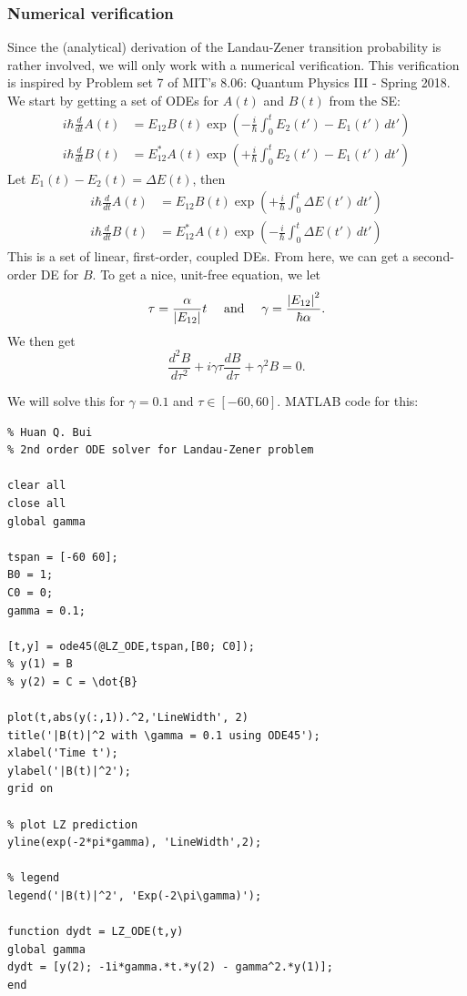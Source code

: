 \documentclass{book}
\theoremstyle{definition}
\newcommand{\al}{\alpha}
\newcommand{\f}[2]{\frac{#1}{#2}}
\newcommand{\lp}{\left(}
\newcommand{\rp}{\right)}
\begin{document}
\subsubsection*{Numerical verification}



Since the (analytical) derivation of the Landau-Zener transition probability is rather involved, we will only work with a numerical verification. This verification is inspired by Problem set 7 of MIT's 8.06: Quantum Physics III - Spring 2018. \\


We start by getting a set of ODEs for $A(t)$ and $B(t)$ from the SE:
\begin{align*}
i\hbar  \f{d}{dt}A(t) &= E_{12} B(t)  \exp\lp -\f{i}{\hbar} \int_0^t E_2(t') - E_1(t') \,dt'\rp\\
i\hbar  \f{d}{dt}B(t) &= E_{12}^* A(t)  \exp\lp +\f{i}{\hbar} \int_0^t E_2(t') - E_1(t') \,dt'\rp
\end{align*}
Let $E_1(t) - E_2(t) = \Delta E(t)$, then 
\begin{align*}
i\hbar  \f{d}{dt}A(t) &= E_{12} B(t)  \exp\lp +\f{i}{\hbar} \int_0^t \Delta E(t') \,dt'\rp\\
i\hbar  \f{d}{dt}B(t) &= E_{12}^* A(t)  \exp\lp -\f{i}{\hbar} \int_0^t \Delta E(t') \,dt'\rp
\end{align*}
This is a set of linear, first-order, coupled DEs. From here, we can get a second-order DE for $B$. To get a nice, unit-free equation, we let
\begin{equation*}
\tau = \f{\al}{\abs{E_{12}}} t \quad \text{ and } \quad \gamma = \f{\abs{E_{12}}^2}{\hbar \al}.
\end{equation*}
We then get
\begin{equation*}
\f{d^2 B}{d\tau^2} + i\gamma \tau \f{dB}{d\tau} + \gamma^2 B = 0.
\end{equation*}

We will solve this for $\gamma = 0.1$ and $\tau \in [-60, 60]$. MATLAB code for this: 
\begin{lstlisting}
% Huan Q. Bui
% 2nd order ODE solver for Landau-Zener problem

clear all
close all
global gamma

tspan = [-60 60];
B0 = 1;
C0 = 0;
gamma = 0.1;

[t,y] = ode45(@LZ_ODE,tspan,[B0; C0]);
% y(1) = B
% y(2) = C = \dot{B}

plot(t,abs(y(:,1)).^2,'LineWidth', 2)
title('|B(t)|^2 with \gamma = 0.1 using ODE45');
xlabel('Time t');
ylabel('|B(t)|^2');
grid on

% plot LZ prediction
yline(exp(-2*pi*gamma), 'LineWidth',2);

% legend
legend('|B(t)|^2', 'Exp(-2\pi\gamma)');

function dydt = LZ_ODE(t,y)
global gamma
dydt = [y(2); -1i*gamma.*t.*y(2) - gamma^2.*y(1)];
end

\end{lstlisting}
\end{document}
